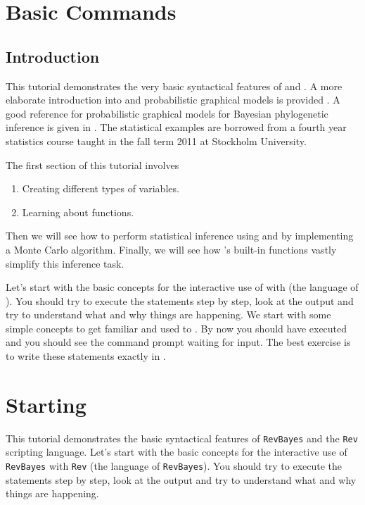\section{Basic \Rev Commands}

\subsection{Introduction}

This tutorial demonstrates the very basic syntactical features of \RevBayes and \Rev. 
A more elaborate introduction into \Rev and probabilistic graphical models is provided .
A good reference for probabilistic graphical models for Bayesian phylogenetic inference is given in \cite{Hoehna2014b}.
The statistical examples are borrowed from a fourth year statistics course taught in the fall term 2011 at Stockholm University.

The first section of this tutorial involves 
\begin{enumerate}
\item Creating different types of variables.
\item Learning about functions. 
\end{enumerate}

Then we will see how to perform statistical inference using \RevBayes and \Rev  by implementing a Monte Carlo algorithm. 
Finally, we will see how \RevBayes 's built-in functions vastly simplify this inference task.

Let's start with the basic concepts for the interactive use of \RevBayes with \Rev (the language of \RevBayes). 
You should try to execute the statements step by step, look at the output and try to understand what and why things are happening. 
We start with some simple concepts to get familiar and used to \RevBayes. 
By now you should have executed \RevBayes and you should see the command prompt waiting for input. 
The best exercise is to write these statements exactly in \RevBayes. 

\section*{Starting \RevBayes}
This tutorial demonstrates the basic syntactical features of \texttt{RevBayes} and the \texttt{Rev} scripting language.
Let's start with the basic concepts for the interactive use of \texttt{RevBayes} with \texttt{Rev} (the language of \texttt{RevBayes}). 
You should try to execute the statements step by step, look at the output and try to understand what and why things are happening.

